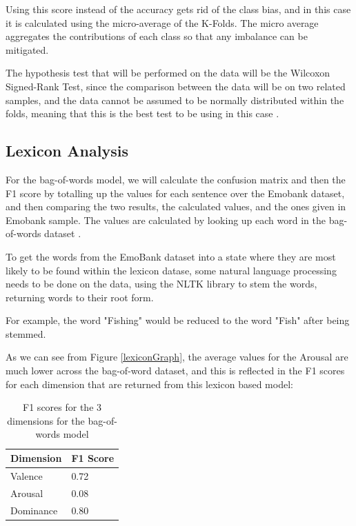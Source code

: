 Using this score instead of the accuracy gets rid of the class bias, and in this case it is calculated using the micro-average of the K-Folds. The micro average aggregates the contributions of each class so that any imbalance can be mitigated.

The hypothesis test that will be performed on the data will be the Wilcoxon Signed-Rank Test, since the comparison between the data will be on two related samples, and the data cannot be assumed to be normally distributed within the folds, meaning that this is the best test to be using in this case \cite{wilcoxon1970critical}.

\subsection{Lexicon Analysis}

For the bag-of-words model, we will calculate the confusion matrix and then the F1 score by totalling up the values for each sentence over the Emobank dataset, and then comparing the two results, the calculated values, and the ones given in Emobank sample. The values are calculated by looking up each word in the bag-of-words dataset \cite{wordsData}.

To get the words from the EmoBank dataset into a state where they are most likely to be found within the lexicon datase, some natural language processing needs to be done on the data, using the NLTK \cite{NLTKBook} library to stem the words, returning words to their root form.

For example, the word "Fishing" would be reduced to the word "Fish" after being stemmed. 

As we can see from Figure \ref{lexiconGraph}, the average values for the Arousal are much lower across the bag-of-word dataset, and this is reflected in the F1 scores for each dimension that are returned from this lexicon based model:

\begin{table}
\centering
\label{lexicon:f1}
\caption{F1 scores for the 3 dimensions for the bag-of-words model}
\begin{tabular}{ |p{3cm}|p{3cm}|}
 \hline
  Dimension & F1 Score \\
 \hline
  Valence & 0.72\\
  Arousal & 0.08 \\
  Dominance & 0.80\\
 \hline
\end{tabular}

\end{table}

